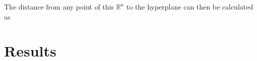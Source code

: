 \documentclass[11pt,
  paper=a4, 
  hidelinks,
  bibliography=totocnumbered,
	captions=tableheading,
	BCOR=10mm
]{scrreprt}
\theoremstyle{definition}
\renewcommand{\vec}[1]{\mathbf{#1}}
\begin{document}





The distance from any point of this $\mathds{R}^n$ to the hyperplane can then be calculated as 





\chapter{Results}
\end{document}
